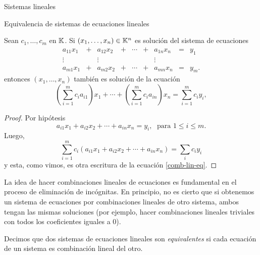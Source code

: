 \begin{chapter}{Sistemas lineales}
\begin{section}{Equivalencia de sistemas de ecuaciones lineales}
            \begin{proposicion}\label{sist-impl}
                Sean $c_1,\ldots,c_m$ en $\mathbb K$. Si $(x_1,\ldots,x_n) \in \mathbb K^n$  es solución del sistema de ecuaciones
                \begin{equation*}
                \begin{matrix}
                a_{11}x_1& + &a_{12}x_2& + &\cdots& + &a_{1n}x_n &= &y_1\\
                \vdots&  &\vdots& &&  &\vdots \\
                a_{m1}x_1& + &a_{m2}x_2& + &\cdots& + &a_{mn}x_n &=&y_m.
                \end{matrix}
                \end{equation*}
                 entonces $(x_1,\ldots,x_n)$ también es solución de la ecuación
                 \begin{equation*}
                 \left(\sum_{i=1}^{m}c_{i}a_{i1}\right)x_1 + \cdots +  	\left(\sum_{i=1}^{m}c_{i}a_{in}\right)x_n = \sum_{i=1}^{m}	c_{i}y_{i},
                 \end{equation*}
            \end{proposicion}
            \begin{proof}
                Por hipótesis
                \begin{equation*}
                a_{i1}x_1 + a_{i2}x_2 + \cdots + a_{in}x_n = y_i,\; \text{ para } 1 \le i \le m.
                \end{equation*}
                Luego, 
                \begin{equation*}
                \sum_{i=1}^m c_i(a_{i1}x_1 + a_{i2}x_2 + \cdots + a_{in}x_n) = \sum_i c_iy_i
                \end{equation*}
                y  esta, como vimos, es otra escritura de la ecuación \eqref{comb-lin-eq}.
            \end{proof}
            
            La idea de hacer combinaciones lineales de ecuaciones es fundamental en el proceso de eliminación de incógnitas. En principio, no es cierto que si obtenemos un sistema de ecuaciones por combinaciones lineales de otro sistema, ambos tengan las mismas soluciones   (por ejemplo, hacer combinaciones lineales triviales con todos los coeficientes iguales a $0$).
        
            \begin{definicion}
            Decimos que dos sistemas de ecuaciones lineales son \textit{equivalentes} si cada ecuación de un sistema es combinación lineal del otro.
            \end{definicion}
            

\end{section}
\end{chapter}
